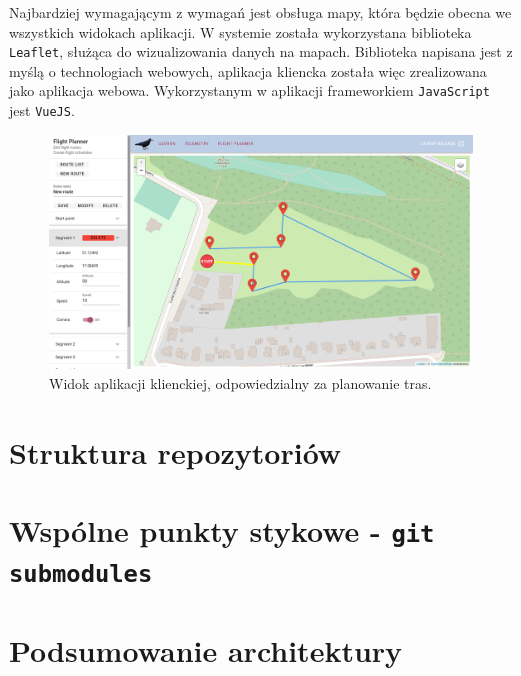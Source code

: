 Najbardziej wymagającym z wymagań jest obsługa mapy, która będzie obecna we wszystkich
widokach aplikacji. W systemie została wykorzystana biblioteka \texttt{Leaflet}, 
służąca do wizualizowania danych na mapach. Biblioteka napisana jest z myślą o technologiach 
webowych, aplikacja kliencka została więc zrealizowana jako aplikacja webowa.
Wykorzystanym w aplikacji frameworkiem \texttt{JavaScript} jest \texttt{VueJS}. 

\begin{figure}[H]
	\centering
\includegraphics[width=\linewidth]{rys03/flight_planner.png}
	\caption{ Widok aplikacji klienckiej, odpowiedzialny za planowanie tras. }
	\label{fig:stronaTytulowa}
\end{figure}


\section{Struktura repozytoriów}

\section{Wspólne punkty stykowe - \texttt{git submodules}}


\section{Podsumowanie architektury}

